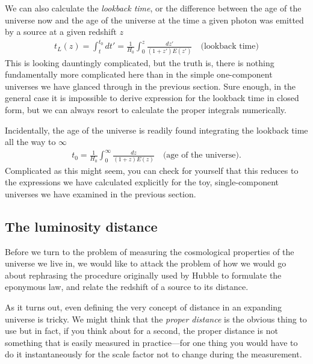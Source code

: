 We can also calculate the \emph{lookback time}, or the difference between the
age of the universe now and the age of the universe at the time a given photon
was emitted by a source at a given redshift $z$
\begin{align}\label{eq:lookback_time_z}
  t_L(z) = \int_t^{t_0} dt' =
  \frac{1}{H_0} \int_0^z \frac{dz'}{(1 + z') E(z')}
  \quad\text{(lookback time)}
\end{align}
This is looking dauntingly complicated, but the truth is, there is nothing fundamentally
more complicated here than in the simple one-component universes we have glanced
through in the previous section. Sure enough, in the general case it is impossible
to derive expression for the lookback time in closed form, but we can always resort
to calculate the proper integrals numerically.

Incidentally, the age of the universe is readily found integrating the lookback
time all the way to $\infty$
\begin{align}
  t_0 = \frac{1}{H_0} \int_0^\infty \frac{dz}{(1 + z) E(z)}
  \quad\text{(age of the universe)}.
\end{align}
Complicated as this might seem, you can check for yourself that this reduces to the
expressions we have calculated explicitly for the toy, single-component universes
we have examined in the previous section.



\subsection{The luminosity distance}
\label{sec:luminosity_distance}

Before we turn to the problem of measuring the cosmological properties of the universe
we live in, we would like to attack the problem of how we would go about rephrasing
the procedure originally used by Hubble to formulate the eponymous law, and relate
the redshift of a source to its distance.

As it turns out, even defining the very concept of distance in an expanding universe
is tricky. We might think that the \emph{proper distance} is the obvious thing to use
but in fact, if you think about for a second, the proper distance is not something
that is easily measured in practice---for one thing you would have to do it
instantaneously for the scale factor not to change during the measurement.

